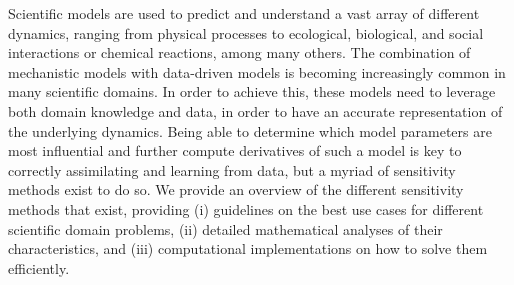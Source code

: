 Scientific models are used to predict and understand a vast array of different dynamics, ranging from physical processes to ecological, biological, and social interactions or chemical reactions, among many others. 
The combination of mechanistic models with data-driven models is becoming increasingly common in many scientific domains. 
In order to achieve this, these models need to leverage both domain knowledge and data, in order to have an accurate representation of the underlying dynamics. 
Being able to determine which model parameters are most influential and further compute derivatives of such a model is key to correctly assimilating and learning from data, but a myriad of sensitivity methods exist to do so. 
We provide an overview of the different sensitivity methods that exist, providing (i) guidelines on the best use cases for different scientific domain problems, (ii) detailed mathematical analyses of their characteristics, and (iii) computational implementations on how to solve them efficiently. 
